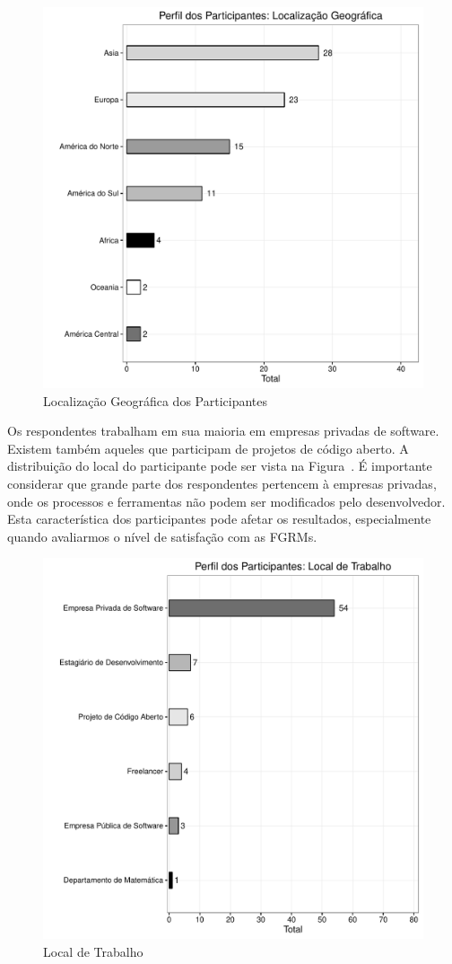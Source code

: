 \begin{figure}[htpb]
	\centering
	\includegraphics[width=0.8\linewidth]{./chapter-pesquisa-com-profissionais/img/grafico_melhorias_fgrm_localizacao_geografica.pdf}
	\caption{Localização Geográfica dos Participantes}
\label{fig:grafico_melhorias_fgrm_localizacao_geografica}
\end{figure}

Os respondentes trabalham em sua maioria em empresas privadas de software.
Existem também aqueles que participam de projetos de código aberto. A
distribuição do local do participante pode ser vista na
Figura~\cite{fig:grafico_melhorias_fgrm_local_trabalho}. É importante considerar
que grande parte dos respondentes pertencem à empresas privadas, onde os
processos e ferramentas não podem ser modificados pelo desenvolvedor. Esta
característica dos participantes pode afetar os resultados, especialmente quando
	avaliarmos o nível de satisfação com as FGRMs. 

\begin{figure}[htpb]
	\centering
	\includegraphics[width=0.8\linewidth]{./chapter-pesquisa-com-profissionais/img/grafico_melhorias_fgrm_local_trabalho.pdf}
	\caption{Local de Trabalho}
\label{fig:grafico_melhorias_fgrm_local_trabalho}
\end{figure}

